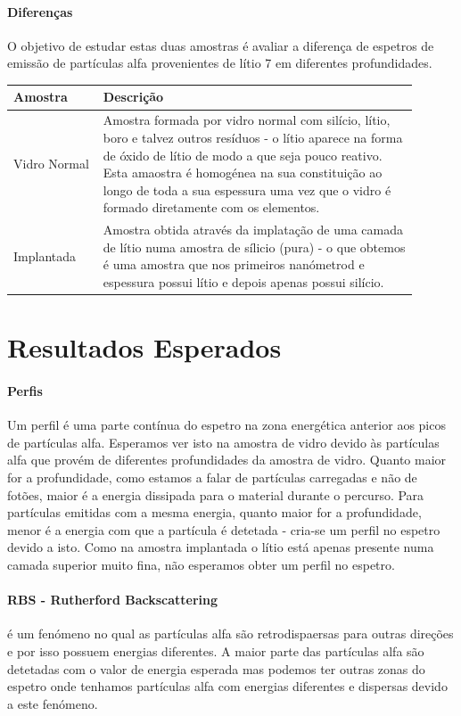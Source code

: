 \documentclass{article}
\begin{document}
\begin{multicols}{2}
\paragraph*{Diferenças} O objetivo de estudar estas duas amostras é avaliar a diferença de espetros de emissão de partículas alfa provenientes de lítio 7 em diferentes profundidades.

\begin{table}[H]
\centering
\begin{tabular}{|w{0.2\linewidth}|w{0.7\linewidth}|}
\hline
Amostra & Descrição \\ \hline
Vidro Normal & Amostra formada por vidro normal com silício, lítio, boro e talvez outros resíduos - o lítio aparece na forma de óxido de lítio de modo a que seja pouco reativo. Esta amaostra é homogénea na sua constituição ao longo de toda a sua espessura uma vez que o vidro é formado diretamente com os elementos. \\ \hline
Implantada & Amostra obtida através da implatação de uma camada de lítio numa amostra de sílicio (pura) - o que obtemos é uma amostra que nos primeiros nanómetrod e espessura possui lítio e depois apenas possui silício. \\ \hline
\end{tabular}
\end{table}

\section{Resultados Esperados}

\paragraph*{Perfis} Um perfil é uma parte contínua do espetro na zona energética anterior aos picos de partículas alfa.
Esperamos ver isto na amostra de vidro devido às partículas alfa que provém de diferentes profundidades da amostra de vidro.
Quanto maior for a profundidade, como estamos a falar de partículas carregadas e não de fotões, maior é a energia dissipada para o material durante o percurso. 
Para partículas emitidas com a mesma energia, quanto maior for a profundidade, menor é a energia com que a partícula é detetada - cria-se um perfil no espetro devido a isto. 
Como na amostra implantada o lítio está apenas presente numa camada superior muito fina, não esperamos obter um perfil no espetro.

\paragraph*{RBS - Rutherford Backscattering} é um fenómeno no qual as partículas alfa são retrodispaersas para outras direções e por isso possuem energias diferentes. 
A maior parte das partículas alfa são detetadas com o valor de energia esperada mas podemos ter outras zonas do espetro onde tenhamos partículas alfa com energias diferentes e dispersas devido a este fenómeno.


\end{multicols}
\end{document}

